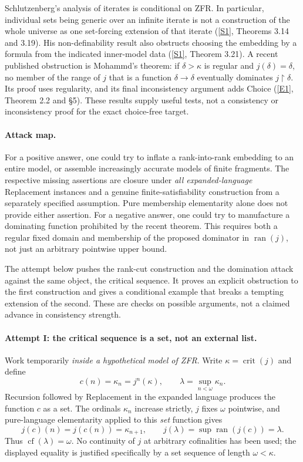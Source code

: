 \documentclass[11pt]{article}
\newcommand{\sref}[2]{\hyperlink{source:#1:#2}{[S#2]}}
\newcommand{\eref}[2]{\hyperlink{extra:#1:#2}{[E#2]}}
\begin{document}
Schlutzenberg's analysis of iterates is conditional on ZFR.  In particular,
individual sets being generic over an infinite iterate is not a construction
of the whole universe as one set-forcing extension of that iterate
(\sref{1357}{1}, Theorems 3.14 and 3.19).  His non-definability result also
obstructs choosing the embedding by a formula from the indicated inner-model
data (\sref{1357}{1}, Theorem 3.21).
A recent published obstruction is Mohammd's theorem: if $\delta>\kappa$
is regular and $j(\delta)=\delta$, no member of the range of $j$ that is a
function $\delta\to\delta$ eventually dominates $j\!\upharpoonright\!\delta$.
Its proof uses regularity, and its final inconsistency argument adds Choice
(\eref{1357}{1}, Theorem 2.2 and \S5).  These results supply useful tests, not a
consistency or inconsistency proof for the exact choice-free target.

\paragraph{Attack map.}
For a positive answer, one could try to inflate a rank-into-rank embedding to
an entire model, or assemble increasingly accurate models of finite fragments.
The respective missing assertions are closure under \emph{all expanded-language}
Replacement instances and a genuine finite-satisfiability construction from a
separately specified assumption.  Pure membership elementarity alone does not
provide either assertion.  For a negative answer, one could try to manufacture
a dominating function prohibited by the recent theorem.  This requires both a
regular fixed domain and membership of the proposed dominator in
$\operatorname{ran}(j)$, not just an arbitrary pointwise upper bound.

The attempt below pushes the rank-cut construction and the domination attack
against the same object, the critical sequence.  It proves an explicit
obstruction to the first construction and gives a conditional example that
breaks a tempting extension of the second.  These are checks on possible
arguments, not a claimed advance in consistency strength.

\paragraph{Attempt I: the critical sequence is a set, not an external list.}
Work temporarily \emph{inside a hypothetical model of ZFR}.  Write
$\kappa=\operatorname{crit}(j)$ and define
\begin{equation}\label{ra1357:critical-sequence}
 c(n)=\kappa_n=j^n(\kappa),\qquad
 \lambda=\sup_{n<\omega}\kappa_n.
\end{equation}
Recursion followed by Replacement in the expanded language produces the
function $c$ as a set.  The ordinals $\kappa_n$ increase strictly, $j$ fixes
$\omega$ pointwise, and pure-language elementarity applied to this \emph{set}
function gives
\[
 j(c)(n)=j(c(n))=\kappa_{n+1},\qquad
 j(\lambda)=\sup\operatorname{ran}(j(c))=\lambda.
\]
Thus $\operatorname{cf}(\lambda)=\omega$.  No continuity of $j$ at arbitrary
cofinalities has been used; the displayed equality is justified specifically
by a set sequence of length $\omega<\kappa$.
\end{document}
